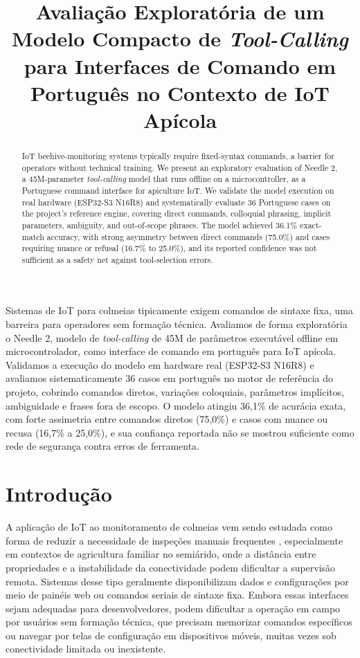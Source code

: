 \documentclass[12pt]{article}
\title{Avaliação Exploratória de um Modelo Compacto de \emph{Tool-Calling}
para Interfaces de Comando em Português no Contexto de IoT Apícola}
\author{}
\begin{document}
\maketitle


\begin{resumo}
Sistemas de IoT para colmeias tipicamente exigem comandos de sintaxe fixa,
uma barreira para operadores sem formação técnica. Avaliamos de forma
exploratória o Needle 2, modelo de \textit{tool-calling} de 45M de
parâmetros executável offline em microcontrolador, como interface de
comando em português para IoT apícola. Validamos a execução do modelo em
hardware real (ESP32-S3 N16R8) e avaliamos sistematicamente 36 casos em
português no motor de referência do projeto, cobrindo comandos diretos,
variações coloquiais, parâmetros implícitos, ambiguidade e frases fora de
escopo. O modelo atingiu 36,1\% de acurácia exata, com forte assimetria
entre comandos diretos (75,0\%) e casos com nuance ou recusa (16,7\% a
25,0\%), e sua confiança reportada não se mostrou suficiente como rede de
segurança contra erros de ferramenta.
\end{resumo}



\begin{abstract}
IoT beehive-monitoring systems typically require fixed-syntax commands, a
barrier for operators without technical training. We present an
exploratory evaluation of Needle 2, a 45M-parameter \textit{tool-calling}
model that runs offline on a microcontroller, as a Portuguese command
interface for apiculture IoT. We validate the model execution on real
hardware (ESP32-S3 N16R8) and systematically evaluate 36 Portuguese cases
on the project's reference engine, covering direct commands, colloquial
phrasing, implicit parameters, ambiguity, and out-of-scope phrases. The
model achieved 36.1\% exact-match accuracy, with strong asymmetry between
direct commands (75.0\%) and cases requiring nuance or refusal (16.7\% to
25.0\%), and its reported confidence was not sufficient as a safety net
against tool-selection errors.
\end{abstract}


\section{Introdução}

A aplicação de IoT ao monitoramento de colmeias vem sendo estudada como forma de reduzir a necessidade de inspeções manuais frequentes \cite{henry2019precision,meikle2015application}, especialmente em contextos de agricultura familiar no semiárido, onde a distância entre propriedades e a instabilidade da conectividade podem dificultar a supervisão remota. Sistemas desse tipo geralmente disponibilizam dados e configurações por meio de painéis web ou comandos seriais de sintaxe fixa. Embora essas interfaces sejam adequadas para desenvolvedores, podem dificultar a operação em campo por usuários sem formação técnica, que precisam memorizar comandos específicos ou navegar por telas de configuração em dispositivos móveis, muitas vezes sob conectividade limitada ou inexistente.
\end{document}
